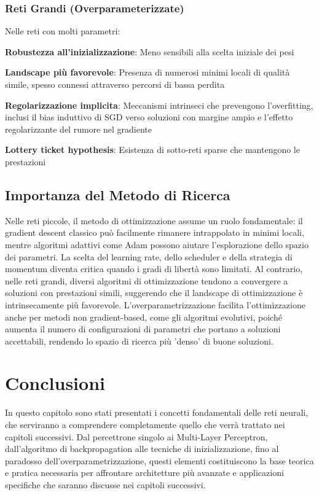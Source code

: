 \subsubsection{Reti Grandi (Overparameterizzate)}
Nelle reti con molti parametri:
\begin{compactitemize}
\item \textbf{Robustezza all'inizializzazione}: Meno sensibili alla scelta iniziale dei pesi
\item \textbf{Landscape più favorevole}: Presenza di numerosi minimi locali di qualità simile, spesso connessi attraverso percorsi di bassa perdita
\item \textbf{Regolarizzazione implicita}: Meccanismi intrinseci che prevengono l'overfitting, inclusi il bias induttivo di SGD verso soluzioni con margine ampio e l'effetto regolarizzante del rumore nel gradiente
\item \textbf{Lottery ticket hypothesis}: Esistenza di sotto-reti sparse che mantengono le prestazioni
\end{compactitemize}

\subsection{Importanza del Metodo di Ricerca}
Nelle reti piccole, il metodo di ottimizzazione assume un ruolo fondamentale: il gradient descent classico può facilmente rimanere intrappolato in minimi locali, mentre algoritmi adattivi come Adam possono aiutare l'esplorazione dello spazio dei parametri. La scelta del learning rate, dello scheduler e della strategia di momentum diventa critica quando i gradi di libertà sono limitati.
Al contrario, nelle reti grandi, diversi algoritmi di ottimizzazione tendono a convergere a soluzioni con prestazioni simili, suggerendo che il landscape di ottimizzazione è intrinsecamente più favorevole. 
L'overparametrizzazione facilita l'ottimizzazione anche per metodi non gradient-based, come gli algoritmi evolutivi, poiché aumenta il numero di configurazioni di parametri che portano a soluzioni accettabili, rendendo lo spazio di ricerca più 'denso' di buone soluzioni.


\section{Conclusioni}
In questo capitolo sono stati presentati i concetti fondamentali delle reti neurali, che serviranno a comprendere completamente quello che verrà trattato nei capitoli successivi. Dal percettrone singolo ai Multi-Layer Perceptron, dall'algoritmo di backpropagation alle tecniche di inizializzazione, fino al paradosso dell'overparametrizzazione, questi elementi costituiscono la base teorica e pratica necessaria per affrontare architetture più avanzate e applicazioni specifiche che saranno discusse nei capitoli successivi.
